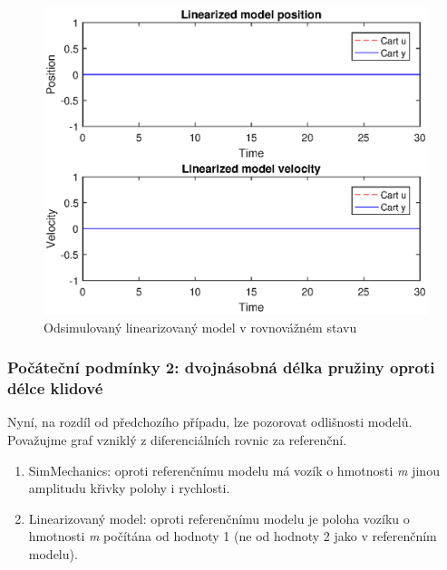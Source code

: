 \begin{figure}[htbp]
	\centering
	\includegraphics[scale=0.7]{graphs/linear_rovnovaha.eps}
	\caption{Odsimulovaný linearizovaný model v rovnovážném stavu}
\end{figure}
\FloatBarrier

\subsubsection{Počáteční podmínky 2: dvojnásobná délka pružiny oproti délce klidové}

Nyní, na rozdíl od předchozího případu, lze pozorovat odlišnosti modelů. Považujme graf vzniklý z diferenciálních rovnic za referenční. 

\begin{enumerate}
    \item SimMechanics: oproti referenčnímu modelu má vozík o hmotnosti \textit{m} jinou amplitudu křivky polohy i rychlosti.
    \item Linearizovaný model: oproti referenčnímu modelu je poloha vozíku o hmotnosti \textit{m} počítána od hodnoty 1 (ne od hodnoty 2 jako v referenčním modelu).
\end{enumerate}

